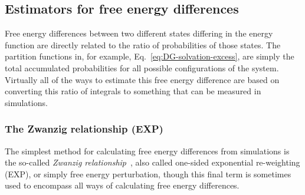 \documentclass[9pt,bestpractices]{livecoms}
\begin{document}
\subsection{Estimators for free energy differences}
\label{subsec:estimators}
Free energy differences between two different states differing in the energy function are directly related to the
ratio of probabilities of those states.
The partition functions in, for example, Eq.~\ref{eq:DG-solvation-excess}, are simply the total accumulated probabilities for all possible configurations of the system. Virtually all of the ways to estimate this free energy difference are based on converting this ratio of integrals to something that can be measured in simulations.  

\subsubsection{The Zwanzig relationship (EXP)}
The simplest method for calculating free energy differences from simulations is the so-called \textit{Zwanzig
relationship}~\cite{zwanzig1954hightemperature}, also called one-sided exponential re-weighting (EXP), or simply free energy perturbation, though this final term is sometimes used to encompass all ways of calculating free energy differences.
\end{document}
